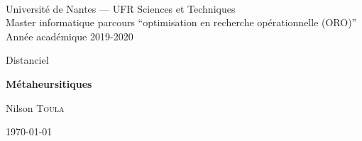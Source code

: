 \documentclass[a4paper,10pt]{article}
\begin{document}
~
\vspace{50mm}
{\large
\begin{center}
  Université de Nantes --- UFR Sciences et Techniques\\
  Master informatique parcours ``optimisation en recherche opérationnelle (ORO)''\\
  Année académique 2019-2020
  \vspace{30mm}
 
  { \LARGE
 
     Distanciel\\
     \vspace{5mm}
 
     {\huge \textbf{Métaheursitiques}}
     \vspace{5mm}
 
     Nilson \textsc{Toula} 
     \vspace{50mm}
  
     \today
  }  
\end{center}
}

\vfill
\break






\end{document}
